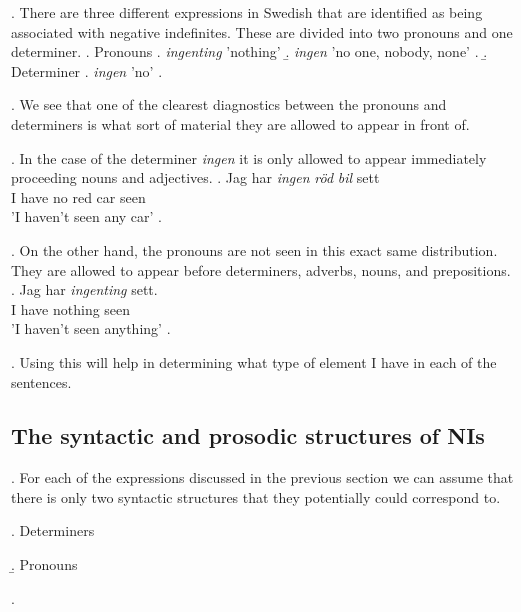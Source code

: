 \documentclass[12pt, letterpaper]{article}
\begin{document}
\ex. There are three different expressions in Swedish that are identified as being associated with negative indefinites. These are divided into two pronouns and one determiner.
	\a. Pronouns
		\a. \textit{ingenting} 'nothing'
		\b. \textit{ingen} 'no one, nobody, none'
		\z.
	\b. Determiner
		\a. \textit{ingen}	'no'
		\z. 

\ex. We see that one of the clearest diagnostics between the pronouns and determiners is what sort of material they are allowed to appear in front of.

\ex. In the case of the determiner \textit{ingen} it is only allowed to appear immediately proceeding nouns and adjectives. 
	\ag. Jag har \textit{ingen} \textit{röd} \textit{bil} sett\\
	I have no red car seen\\
	'I haven't seen any car'
	\z. 

\ex. On the other hand, the pronouns are not seen in this exact same distribution. They are allowed to appear before determiners, adverbs, nouns, and prepositions. 
	\ag. Jag har \textit{ingenting} sett.\\
	I have nothing seen\\
	'I haven't seen anything'
	\z. 

\ex. Using this will help in determining what type of element I have in each of the sentences.


\subsection*{The syntactic and prosodic structures of NIs} \label{sec:prosodic}

\ex. For each of the expressions discussed in the previous section we can assume that there is only two syntactic structures that they potentially could correspond to.
	\begin{multicols}{2}
	\a. Determiners\\
	\b. Pronouns\\
	\z.
	\end{multicols}
\end{document}
